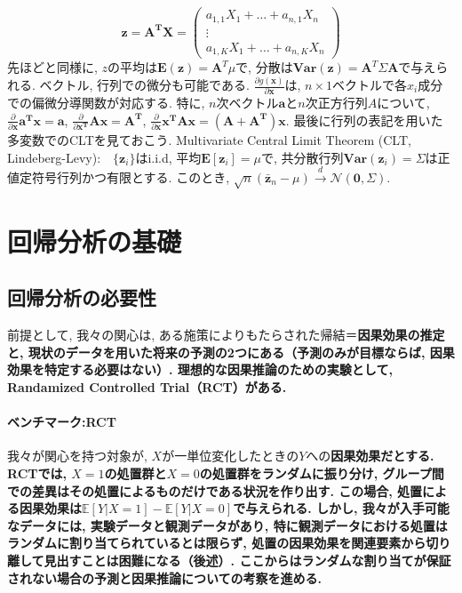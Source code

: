 \documentclass[paper=a4paper,fontsize=10pt]{jlreq}
\begin{document}
\begin{equation*}
  \mathbf{z}=\mathbf{A^T X} = \begin{pmatrix} a_{1, 1}X_1+\dots+a_{n, 1}X_n \\ \vdots \\ a_{1, K}X_1+\dots+a_{n, K}X_n \end{pmatrix}
\end{equation*}
先ほどと同様に, $z$の平均は$\mathbf{E(z)}=\mathbf{A}^T\mu$で, 分散は$\mathbf{Var(z)}=\mathbf{A}^T \Sigma \mathbf{A}$で与えられる. ベクトル, 行列での微分も可能である. $\frac{\partial g(\mathbf{x})}{\partial \mathbf{x}}$は, $n\times 1$ベクトルで各$x_i$成分での偏微分導関数が対応する. 特に, $n$次ベクトル$\mathbf{a}$と$n$次正方行列$A$について, $\frac{\partial}{\partial \mathbf{x}}\mathbf{a^T x}=\mathbf{a}$, $\frac{\partial}{\partial \mathbf{x^T}}\mathbf{A x}=\mathbf{A^T}$, $\frac{\partial}{\partial \mathbf{x}}\mathbf{x^T A x}=\mathbf{(A+A^T)x}$. 最後に行列の表記を用いた多変数でのCLTを見ておこう. Multivariate Central Limit Theorem (CLT, Lindeberg-Levy):　$\{\mathbf{z}_i\}$はi.i.d, 平均$\mathbf{E}[\mathbf{z}_i]=\mu$で, 共分散行列$\mathbf{Var}(\mathbf{z}_i)=\Sigma$は正値定符号行列かつ有限とする. このとき, $\sqrt{n}(\bar{\mathbf{z}}_n-\mu) \overset{d}{\to}\mathcal{N}(\mathbf{0},\Sigma)$.\\

\section{回帰分析の基礎}
\subsection{回帰分析の必要性}
前提として, 我々の関心は, ある施策によりもたらされた帰結＝\rmfamily\mcfamily\bfseries{因果効果の推定}\mdseries と, 現状のデータを用いた\rmfamily\mcfamily\bfseries{将来の予測}\mdseries の2つにある（予測のみが目標ならば, 因果効果を特定する必要はない）. 理想的な因果推論のための実験として, \rmfamily\mcfamily\bfseries{Randamized Controlled Trial（RCT）}\mdseries がある.\\

\paragraph{ベンチマーク:RCT}
我々が関心を持つ対象が, $X$が一単位変化したときの$Y$への\rmfamily\mcfamily\bfseries{因果効果}\mdseries だとする. RCTでは, $X=1$の処置群と$X=0$の処置群を\rmfamily\mcfamily\bfseries{ランダム}\mdseries に振り分け, グループ間での差異はその処置によるものだけである状況を作り出す. この場合, 処置による\rmfamily\mcfamily\bfseries{因果効果}\mdseries は$\mathbb{E}[Y|X=1]-\mathbb{E}[Y|X=0]$で与えられる. しかし, 我々が入手可能なデータには, 実験データと観測データがあり, 特に観測データにおける処置はランダムに割り当てられているとは限らず, 処置の因果効果を関連要素から切り離して見出すことは困難になる（後述）. ここからはランダムな割り当てが保証されない場合の予測と因果推論についての考察を進める. \\
\end{document}

